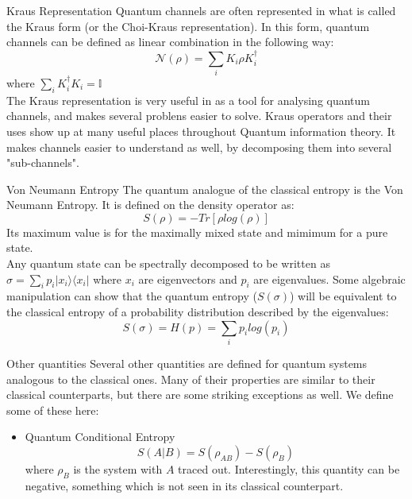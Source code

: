 \begin{frame}{Kraus Representation}
    Quantum channels are often represented in what is called the Kraus form (or the Choi-Kraus representation). In this form, quantum channels can be defined
    as linear combination in the following way:
    \begin{equation}
        \mathcal{N}(\rho) = \sum_i K_i \rho K_i^\dagger 
    \end{equation}
    where $\sum_i K_i^\dagger K_i = \mathbb{I} $\\
    The Kraus representation is very useful in as a tool for analysing quantum channels, and makes several problens easier to solve. Kraus operators and their
    uses show up at many useful places throughout Quantum information theory. It makes channels easier to understand as well, by decomposing them into several
    "sub-channels".
\end{frame}

\begin{frame}{Von Neumann Entropy}
    The quantum analogue of the classical entropy is the Von Neumann Entropy. It is defined on the density operator as:
    \begin{equation}
        S(\rho) = -Tr[\rho log(\rho)]
    \end{equation}
    Its maximum value is for the maximally mixed state and mimimum for a pure state.\\
    Any quantum state can be spectrally decomposed to be written as $\sigma = \sum_{i}p_i | x_i \rangle \langle x_i |$ where ${x_i}$ are eigenvectors
    and ${p_i}$ are eigenvalues. Some algebraic manipulation can show that the quantum entropy ($S(\sigma)$) will be equivalent to the classical entropy of
    a probability distribution described by the eigenvalues:
    \begin{equation}
        S(\sigma) = H(p) = \sum_i p_i log(p_i)
    \end{equation}
\end{frame}

\begin{frame}{Other quantities}
    Several other quantities are defined for quantum systems analogous to the classical ones. Many of their properties are similar to their classical counterparts,
    but there are some striking exceptions as well. We define some of these here:
    \begin{itemize}
        \item Quantum Conditional Entropy
        $$S(A|B) = S(\rho_{AB}) - S(\rho_B)$$
        where $\rho_B$ is the system with $A$ traced out. Interestingly, this quantity can be negative, something which is not seen in its classical counterpart.
    \end{itemize}
\end{frame}

